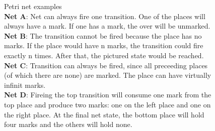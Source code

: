 \begin{figure}
  \caption{
    Petri net examples\\
    \textbf{Net A}: Net can always fire one transition. One of the places will always have a mark. If one has a mark, the over will be unmarked.\\
    \textbf{Net B}: The transition cannot be fired because the place has no marks. If the place would have n marks, the transition could fire exactly n times. After that, the pictured state would be reached.\\
    \textbf{Net C}: Transition can always be fired, since all preceeding places (of which there are none) are marked. The place can have virtually infinit marks.\\
    \textbf{Net D}: Fireing the top transition will consume one mark from the top place and produce two marks: one on the left place and one on the right place. At the final net state, the bottom place will hold four marks and the others will hold none.
    }
    \label{petrNetExamples}
\end{figure}
